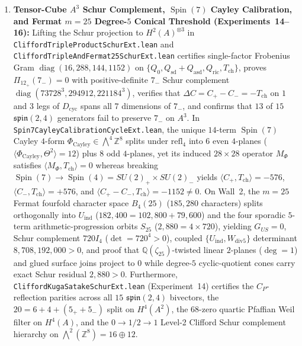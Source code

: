\documentclass[11pt,a4paper]{article}
\begin{document}
\begin{enumerate}
  \item \textbf{Tensor-Cube $A^3$ Schur Complement, $\operatorname{Spin}(7)$ Cayley Calibration, and Fermat $m = 25$ Degree-$5$ Conical Threshold (Experiments~14--16):} Lifting the Schur projection to $H^2(A)^{\otimes 3}$ in {\small\texttt{Clifford\allowbreak{}Triple\allowbreak{}Product\allowbreak{}Schur\allowbreak{}Ext.lean}} and {\small\texttt{Clifford\allowbreak{}Triple\allowbreak{}And\allowbreak{}Fermat25\allowbreak{}Schur\allowbreak{}Ext.lean}} certifies single-factor Frobenius Gram $\operatorname{diag}(16, 288, 144, 1152)$ on $\{Q_0, Q_{\mathrm{sd}} + Q_{\mathrm{asd}}, Q_{\mathrm{ric}}, T_{\mathrm{ch}}\}$, proves $\Pi_{12_+}(7_-) = 0$ with positive-definite $7_-$ Schur complement $\operatorname{diag}(73728^3, 294912, 221184^3)$, verifies that $\Delta C = C_+ - C_- = -T_{\mathrm{ch}}$ on $1$ and $3$ legs of $D_{\mathrm{cyc}}$ spans all $7$ dimensions of $7_-$, and confirms that $13$ of $15$ $\mathfrak{spin}(2,4)$ generators fail to preserve $7_-$ on $A^3$. In {\small\texttt{Spin7\allowbreak{}Cayley\allowbreak{}Calibration\allowbreak{}Cycle\allowbreak{}Ext.lean}}, the unique $14$-term $\operatorname{Spin}(7)$ Cayley $4$-form $\Phi_{\mathrm{Cayley}} \in \bigwedge^4 \mathbb{Z}^8$ splits under $\mathrm{refl}_4$ into $6$ even $4$-planes ($\langle \Phi_{\mathrm{Cayley}}, \Theta^2\rangle = 12$) plus $8$ odd $4$-planes, yet its induced $28\times 28$ operator $M_\Phi$ satisfies $\langle M_\Phi, T_{\mathrm{ch}}\rangle = 0$ whereas breaking $\operatorname{Spin}(7) \to \operatorname{Spin}(4) = SU(2)_+ \times SU(2)_-$ yields $\langle C_+, T_{\mathrm{ch}}\rangle = -576$, $\langle C_-, T_{\mathrm{ch}}\rangle = +576$, and $\langle C_+ - C_-, T_{\mathrm{ch}}\rangle = -1152 \neq 0$. On Wall~2, the $m = 25$ Fermat fourfold character space $B_4(25)$ ($185{,}280$ characters) splits orthogonally into $U_{\mathrm{ind}}$ ($182{,}400 = 102{,}800 + 79{,}600$) and the four sporadic $5$-term arithmetic-progression orbits $S_{25}$ ($2{,}880 = 4 \times 720$), yielding $G_{US} = 0$, Schur complement $720 I_4$ ($\det = 720^4 > 0$), coupled $\{U_{\mathrm{ind}}, W_{\mathrm{div5}}\}$ determinant $8{,}708{,}192{,}000 > 0$, and proof that $\mathbb{Q}(\zeta_{25})$-twisted linear $2$-planes ($\deg = 1$) and glued surface joins project to $0$ while degree-$5$ cyclic-quotient cones carry exact Schur residual $2{,}880 > 0$. Furthermore, {\small\texttt{Clifford\allowbreak{}Kuga\allowbreak{}Satake\allowbreak{}Schur\allowbreak{}Ext.lean}} (Experiment~14) certifies the $C_P$-reflection parities across all $15$ $\mathfrak{spin}(2,4)$ bivectors, the $20 = 6 + 4 + (5_+ + 5_-)$ split on $H^4(A^2)$, the $68$-zero quartic Pfaffian Weil filter on $H^4(A)$, and the $0 \to 1/2 \to 1$ Level-2 Clifford Schur complement hierarchy on $\bigwedge^2(\mathbb{Z}^8) = 16 \oplus 12$.

\end{enumerate}
\end{document}
